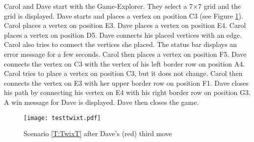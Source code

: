 Carol and Dave start \twixt with the Game-Explorer. They select a 7$\times$7 grid and the grid is displayed. Dave starts and places a vertex on position C3 (see Figure \ref{img:TESTGRTWIXT}). Carol places a vertex on position E3. Dave places a vertex on position E4. Carol places a vertex on position D5. Dave connects his placed vertices with an edge. Carol also tries to connect the vertices she placed. The status bar displays an error message for a few seconds. Carol then places a vertex on position F5. Dave connects the vertex on C3 with the vertex of his left border row on position A4. Carol tries to place a vertex on position C3, but it does not change. Carol then connects the vertex on E3 with her upper border row on position F1. Dave closes his path by connecting his vertex on E4 with his right border row on position G3. A win message for Dave is displayed. Dave then closes the game.

\begin{figure}[h!]
	\centering
	\texttt{[image: testtwixt.pdf]}
	\caption{Scenario \ref{T:TwixT} after Dave's (red) third move}
	\label{img:TESTGRTWIXT}
\end{figure}